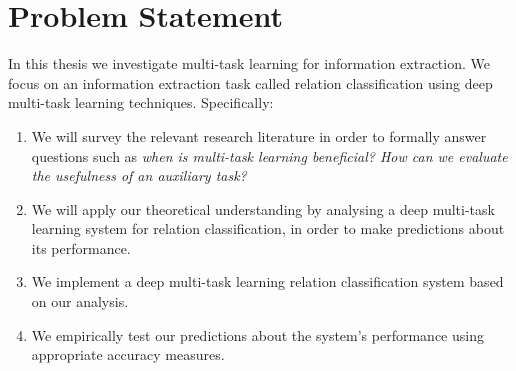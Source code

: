 \section{Problem Statement}
In this thesis we investigate multi-task learning for information extraction. We focus on an information extraction task called relation classification using deep multi-task learning techniques. Specifically:
\begin{enumerate}
	\item We will survey the relevant research literature in order to formally answer questions such as \textit{when is multi-task learning beneficial? How can we evaluate the usefulness of an auxiliary task?}
	\item We will apply our theoretical understanding by analysing a deep multi-task learning system for relation classification, in order to make predictions about its performance.
	\item We implement a deep multi-task learning relation classification system based on our analysis.
	\item We empirically test our predictions about the system's performance using appropriate accuracy measures.
\end{enumerate}